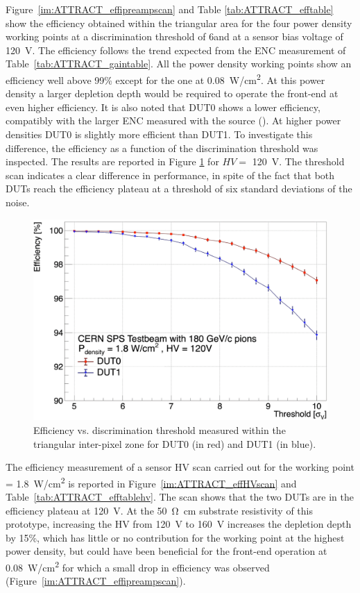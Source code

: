 		Figure~\ref{im:ATTRACT_effipreampscan} and Table \ref{tab:ATTRACT_efftable} show the efficiency obtained within the triangular area for the four power density working points at a discrimination threshold of 6\noise and at a sensor bias voltage of \SI{120}{\volt}. The efficiency follows the trend expected from the ENC measurement of Table~\ref{tab:ATTRACT_gaintable}. All the power density working points show an efficiency well above 99\% except for the one at \SI{0.08}{\watt/\centi\meter^2}. At this power density a larger depletion depth would be required to operate the front-end at even higher efficiency. It is also noted that DUT0 shows a lower efficiency, compatibly with the larger ENC measured with the \Cd source (). At higher power densities DUT0 is slightly more efficient than DUT1. To investigate this difference, the efficiency as a function of the discrimination threshold was inspected. The results are reported in Figure \ref{im:ATTRACT_effthrscan} for $ HV =$ \SI{120}{\volt}. The threshold scan indicates a clear difference in performance, in spite of the fact that both DUTs reach the efficiency plateau at a threshold of six standard deviations of the noise. 

		\begin{figure}[h]
			\centering 
			\includegraphics[width=0.65\linewidth]{files/ATTRACT_paper/EfficiencyScan_120V_150uA}
			\caption{Efficiency vs. discrimination threshold measured within the triangular inter-pixel zone for  DUT0 (in red) and DUT1 (in blue).}
			\label{im:ATTRACT_effthrscan} 
		\end{figure}

		The efficiency measurement of a sensor HV scan carried out for the working point  \power = \SI{1.8}{\watt/\centi\meter^2} is reported in Figure~\ref{im:ATTRACT_effHVscan} and Table~\ref{tab:ATTRACT_efftablehv}. 
		The scan shows that the two DUTs are in the efficiency plateau at \SI{120}{\volt}. At the \SI{50}{\ohm\cm} substrate resistivity of this prototype, increasing the HV from \SI{120}{\volt} to \SI{160}{\volt} increases the depletion depth by 15\%, which has little or no contribution for the working point at the highest power density, but could have been beneficial for the front-end operation at \SI{0.08}{\watt/\centi\meter^2} for which a small drop in efficiency was observed (Figure~\ref{im:ATTRACT_effipreampscan}).
		
